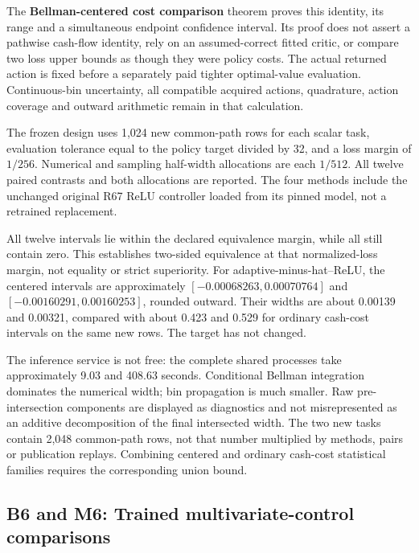 The \textbf{Bellman-centered cost comparison} theorem proves this
identity, its range and a simultaneous endpoint confidence interval. Its
proof does not assert a pathwise cash-flow identity, rely on an
assumed-correct fitted critic, or compare two loss upper bounds as
though they were policy costs. The actual returned action is fixed
before a separately paid tighter optimal-value evaluation.
Continuous-bin uncertainty, all compatible acquired actions, quadrature,
action coverage and outward arithmetic remain in that calculation.

The frozen design uses 1,024 new common-path rows for each scalar task,
evaluation tolerance equal to the policy target divided by 32, and a
loss margin of \(1/256\). Numerical and sampling half-width allocations
are each \(1/512\). All twelve paired contrasts and both allocations are
reported. The four methods include the unchanged original R67 ReLU
controller loaded from its pinned model, not a retrained replacement.

All twelve intervals lie within the declared equivalence margin, while
all still contain zero. This establishes two-sided equivalence at that
normalized-loss margin, not equality or strict superiority. For
adaptive-minus-hat--ReLU, the centered intervals are approximately
\([-0.00068263,0.00070764]\) and \([-0.00160291,0.00160253]\), rounded
outward. Their widths are about 0.00139 and 0.00321, compared with about
0.423 and 0.529 for ordinary cash-cost intervals on the same new rows.
The target has not changed.

The inference service is not free: the complete shared processes take
approximately 9.03 and 408.63 seconds. Conditional Bellman integration
dominates the numerical width; bin propagation is much smaller. Raw
pre-intersection components are displayed as diagnostics and not
misrepresented as an additive decomposition of the final intersected
width. The two new tasks contain 2,048 common-path rows, not that number
multiplied by methods, pairs or publication replays. Combining centered
and ordinary cash-cost statistical families requires the corresponding
union bound.

\hypertarget{b6-and-m6-trained-multivariate-control-comparisons}{%
\subsection{B6 and M6: Trained multivariate-control
comparisons}\label{b6-and-m6-trained-multivariate-control-comparisons}}

